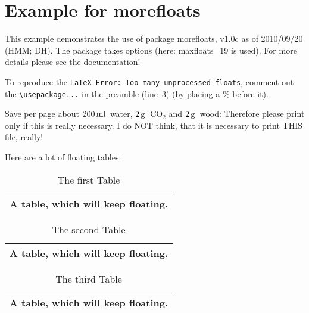 \documentclass[british]{article}
\gdef\unit#1{\mathord{\thinspace\mathrm{#1}}}%
\begin{document}
\section*{Example for morefloats}

This example demonstrates the use of package\newline
\textsf{morefloats}, v1.0c as of 2010/09/20 (HMM; DH).\newline
The package takes options (here: maxfloats=19 is used).\newline
For more details please see the documentation!\newline

To reproduce the\newline
\texttt{\LaTeX\ Error: Too many unprocessed floats},\newline
comment out the \texttt{\textbackslash usepackage...} in the preamble (line~3)
(by placing a \% before it).\newline

\bigskip

Save per page about $200\unit{ml}$~water, $2\unit{g}$~CO$_{2}$
and $2\unit{g}$~wood:\newline
Therefore please print only if this is really necessary.\newline
I do NOT think, that it is necessary to print THIS file, really!

\pagebreak

Here are a lot of floating tables:\newline

\begin{table}[t] \centering%
\begin{tabular}{|l|}
\hline
A table, which will keep floating.\\ \hline
\end{tabular}%
\caption{The first Table}%
\end{table}%

\begin{table}[t] \centering%
\begin{tabular}{|l|}
\hline
A table, which will keep floating.\\ \hline
\end{tabular}%
\caption{The second Table}%
\end{table}%

\begin{table}[t] \centering%
\begin{tabular}{|l|}
\hline
A table, which will keep floating.\\ \hline
\end{tabular}%
\caption{The third Table}%
\end{table}%
\end{document}
